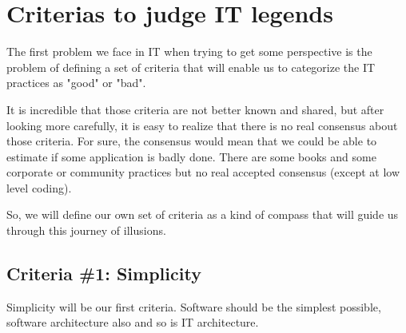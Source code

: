 \documentclass[]{article}
\title{\mytitle}
\author{\myauthor}
\date{\mydate}
\begin{document}
\maketitle

\begin{abstract}
Information technology (IT) is a very recent engineering discipline and no one implied in IT projects should never forget this fact. Like all recent technological discipline at the heart of all modern businesses, it is both a marvelous tool, because it is "soft"-ware, a formidable enabler for business, and as it is representing lots of money, it is also a great place for legends and marketing messages.

As IT is a very intellectual discipline, both an engineering discipline and a creative activity, as the entry ticket of making a program run is very low, it is very easy to believe things that are untrue and to loose the global perspective of what IT is for and what are the problems it should answer to.
\end{abstract}

\section{Criterias to judge IT legends}

The first problem we face in IT when trying to get some perspective is the problem of defining a set of criteria that will enable us to categorize the IT practices as "good" or "bad".

It is incredible that those criteria are not better known and shared, but after looking more carefully, it is easy to realize that there is no real consensus about those criteria. For sure, the consensus would mean that we could be able to estimate if some application is badly done. There are some books and some corporate or community practices but no real accepted consensus (except at low level coding).

So, we will define our own set of criteria as a kind of compass that will guide us through this journey of illusions.

\subsection{Criteria \#1: Simplicity}

Simplicity will be our first criteria. Software should be the simplest possible, software architecture also and so is IT architecture.
\end{document}
